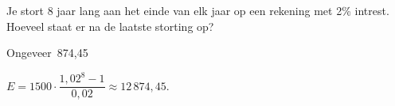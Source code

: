 \begin{oefeningen}
\begin{oefening}
Je stort 8 jaar lang aan het einde van elk jaar  op een rekening met 2\% intrest. Hoeveel staat er na de laatste storting op?
\begin{solution}
Ongeveer \,874,45
\end{solution}
\begin{fullsolution}
$E=1500\cdot\dfrac{1{,}02^8-1}{0{,}02}\approx 12\,874{,}45$.
\end{fullsolution}
\end{oefening}
\end{oefeningen}

\opdrachtenkop


